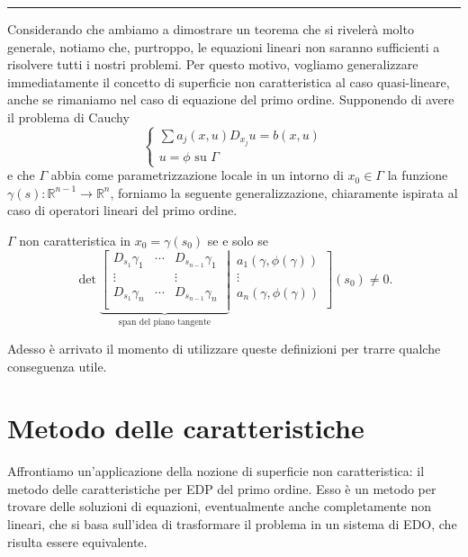 \noindent\rule[0.5ex]{\linewidth}{0.2pt}
Considerando che ambiamo a dimostrare un teorema che si rivelerà molto generale, notiamo che, purtroppo, le equazioni lineari non saranno sufficienti a risolvere tutti i nostri problemi. Per questo motivo, vogliamo generalizzare immediatamente il concetto di superficie non caratteristica al caso quasi-lineare, anche se rimaniamo nel caso di equazione del primo ordine. Supponendo di avere il problema di Cauchy
\begin{equation}
\begin{cases}
\sum a_j(x,u)D_{x_j} u = b(x,u)\\
u = \phi \text{ su } \Gamma
\end{cases}
\end{equation}
e che $\Gamma$ abbia come parametrizzazione locale in un intorno di $x_0\in \Gamma$ la funzione $\gamma (s): \mathbb{R}^{n-1}\rightarrow \mathbb{R}^n$, forniamo la seguente generalizzazione, chiaramente ispirata al caso di operatori lineari del primo ordine.
\begin{definition}
$\Gamma$ non caratteristica in $x_0=\gamma (s_0)$ se e solo se\\
\begin{equation*}
\det
\underbrace{
\left[
\begin{matrix}
D_{s_1}\gamma_1 & \cdots & D_{s_{n-1}}\gamma_1 \\
\vdots &  & \vdots \\
D_{s_1}\gamma_n & \cdots & D_{s_{n-1}}\gamma_n \\
\end{matrix}\;\right|}_{\text{span del piano tangente}} \,
\left.
\begin{matrix}
a_1(\gamma, \phi(\gamma))\\
\vdots\\
a_n(\gamma, \phi(\gamma))\\
\end{matrix}\right] (s_0) \neq 0.
\end{equation*}
\end{definition}
Adesso è arrivato il momento di utilizzare queste definizioni per trarre qualche conseguenza utile.

\newpage
\section{Metodo delle caratteristiche}
Affrontiamo un'applicazione della nozione di superficie non caratteristica: il metodo delle caratteristiche per EDP del primo ordine. 
Esso è un metodo per trovare delle soluzioni di equazioni, eventualmente anche completamente non lineari, che si basa sull'idea di trasformare il problema in un sistema di EDO, che risulta essere equivalente. 

